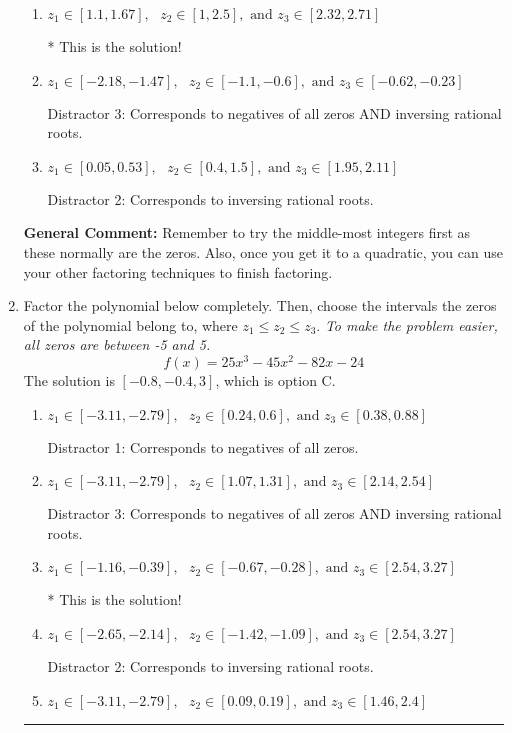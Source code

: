 \documentclass{extbook}[14pt]
\newcommand{\litem}[1]{\item #1

\rule{\textwidth}{0.4pt}}
\begin{document}
\begin{enumerate}
{\begin{enumerate}[label=\Alph*.]
 Distractor 4: Corresponds to moving factors from one rational to another.
\item \( z_1 \in [1.1, 1.67], \text{   }  z_2 \in [1, 2.5], \text{   and   } z_3 \in [2.32, 2.71] \)

* This is the solution!
\item \( z_1 \in [-2.18, -1.47], \text{   }  z_2 \in [-1.1, -0.6], \text{   and   } z_3 \in [-0.62, -0.23] \)

 Distractor 3: Corresponds to negatives of all zeros AND inversing rational roots.
\item \( z_1 \in [0.05, 0.53], \text{   }  z_2 \in [0.4, 1.5], \text{   and   } z_3 \in [1.95, 2.11] \)

 Distractor 2: Corresponds to inversing rational roots.
\end{enumerate}

\textbf{General Comment:} Remember to try the middle-most integers first as these normally are the zeros. Also, once you get it to a quadratic, you can use your other factoring techniques to finish factoring.
}
\litem{
Factor the polynomial below completely. Then, choose the intervals the zeros of the polynomial belong to, where $z_1 \leq z_2 \leq z_3$. \textit{To make the problem easier, all zeros are between -5 and 5.}
\[ f(x) = 25x^{3} -45 x^{2} -82 x -24 \]The solution is \( [-0.8, -0.4, 3] \), which is option C.\begin{enumerate}[label=\Alph*.]
\item \( z_1 \in [-3.11, -2.79], \text{   }  z_2 \in [0.24, 0.6], \text{   and   } z_3 \in [0.38, 0.88] \)

 Distractor 1: Corresponds to negatives of all zeros.
\item \( z_1 \in [-3.11, -2.79], \text{   }  z_2 \in [1.07, 1.31], \text{   and   } z_3 \in [2.14, 2.54] \)

 Distractor 3: Corresponds to negatives of all zeros AND inversing rational roots.
\item \( z_1 \in [-1.16, -0.39], \text{   }  z_2 \in [-0.67, -0.28], \text{   and   } z_3 \in [2.54, 3.27] \)

* This is the solution!
\item \( z_1 \in [-2.65, -2.14], \text{   }  z_2 \in [-1.42, -1.09], \text{   and   } z_3 \in [2.54, 3.27] \)

 Distractor 2: Corresponds to inversing rational roots.
\item \( z_1 \in [-3.11, -2.79], \text{   }  z_2 \in [0.09, 0.19], \text{   and   } z_3 \in [1.46, 2.4] \)


\end{enumerate}}
\end{enumerate}
\end{document}
